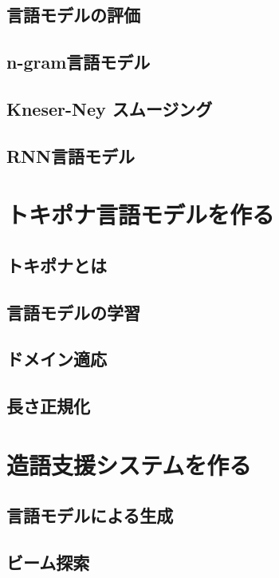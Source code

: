 \documentclass[11pt]{report}
\begin{document}
\section{言語モデルの評価}

\section{n-gram言語モデル}

\section{Kneser-Ney スムージング}

\section{RNN言語モデル}

\chapter{トキポナ言語モデルを作る}

\section{トキポナとは}

\section{言語モデルの学習}

\section{ドメイン適応}

\section{長さ正規化}

\chapter{造語支援システムを作る}

\section{言語モデルによる生成}

\section{ビーム探索}
\end{document}
